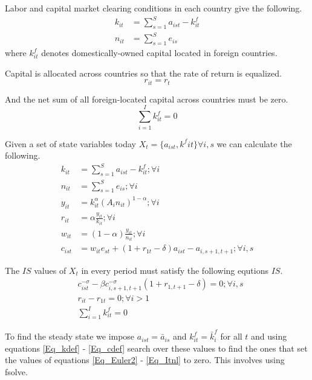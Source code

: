 \documentclass[letterpaper,12pt]{article}
\theoremstyle{definition}
\numberwithin{equation}{section}
\begin{document}
\begin{spacing}{1.5}
	Labor and capital market clearing conditions in each country give the following.
	\begin{align}
		k_{it} & = \sum_{s=1}^S a_{ist} - k_{it}^f\\
		n_{it} & = \sum_{s=1}^S e_{is}
	\end{align}
	where $k_{it}^f$ denotes domestically-owned capital located in foreign countries.

	Capital is allocated across countries so that the rate of return is equalized.
	\begin{equation} \label{Eq_requal}
		r_{it} = r_t
	\end{equation}

	And the net sum of all foreign-located capital across countries must be zero.
	\begin{equation}
		\sum_{i=1}^I k^f_{it} = 0
	\end{equation}

	Given a set of state variables today $X_t = \{a_{ist},k^f{it}\} \forall i,s$ we can calculate the following.
	\begin{align}
		k_{it} & = \sum_{s=1}^S a_{ist} - k_{it}^f; \forall i \label{Eq_kdef}\\
		n_{it} & = \sum_{s=1}^S e_{is}; \forall i \\
		y_{it} & = k_{it}^\alpha \left( A_{i} n_{it} \right)^{1-\alpha} ; \forall i \\
		r_{it} & = \alpha \frac{y_{it}}{k_{it}}; \forall i \label{Eq_rdef}\\
		w_{it} & = (1-\alpha) \frac{y_{it}}{n_{it}}; \forall i \label{Eq_wdef}\\		
    	c_{ist} & = w_{it} e_{st} + (1+r_{1t}-\delta)a_{ist} - a_{i,s+1,t+1} ; \forall i,s \label{Eq_cdef}
	\end{align}

	The $IS$ values of $X_t$ in every period must satisfy the following equtions $IS$.
	\begin{align}
		& c_{ist}^{-\sigma} - \beta c_{i,s+1,t+1}^{-\sigma}(1+r_{1,t+1}-\delta) = 0; \forall i,s \label{Eq_Euler2}\\ 
		& r_{it} - r_{1t} = 0; \forall i>1 \\
		& \sum_{i=1}^I k^f_{it} = 0 \label{Eq_Itnl}
	\end{align}

	To find the steady state we impose $a_{ist} = \bar a_{is}$ and $k^f_{it}=\bar k^f_i$ for all $t$ and using equations \eqref{Eq_kdef} - \eqref{Eq_cdef} search over these values to find the ones that set the values of equations \eqref{Eq_Euler2} - \eqref{Eq_Itnl} to zero.  This involves using fsolve.


\end{spacing}
\end{document}
